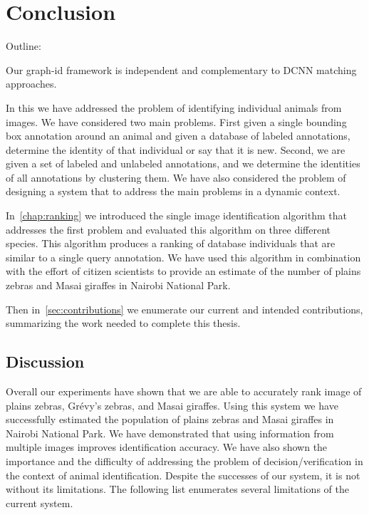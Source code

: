 \begin{comment}
    ./texfix.py --fpaths chapter6-conclusion.tex --outline --asmarkdown --numlines=99 -w
\end{comment}

\chapter{Conclusion}\label{chap:conclusion} %

    Outline:
    \begin{itemln}
        \item Our graph-id framework is independent and complementary to DCNN matching approaches.
    \end{itemln}

    In this \thesis{} we have addressed the problem of identifying individual animals from images. We have considered
    two main problems. First given a single bounding box annotation around an animal and given a database of labeled
    annotations, determine the identity of that individual or say that it is new. Second, we are given a set of labeled
    and unlabeled annotations, and we determine the identities of all annotations by clustering them. We have also
    considered the problem of designing a system that to address the main problems in a dynamic context.

    In~\cref{chap:ranking} we introduced the single image identification algorithm that addresses the first problem and
    evaluated this algorithm on three different species. This algorithm produces a ranking of database individuals that
    are similar to a single query annotation.
    We have used this algorithm in combination with the effort of citizen scientists to provide an estimate of the
    number of plains zebras and Masai giraffes in Nairobi National Park.
    
    Then in~\cref{sec:contributions} we enumerate our current and intended
      contributions, summarizing the work needed to complete this thesis.

    \section{Discussion}\label{sec:discussresult} 

        Overall our experiments have shown that we are able to accurately rank image of plains zebras, Grévy's zebras,
        and Masai giraffes. Using this system we have successfully estimated the population of plains zebras and Masai
        giraffes in Nairobi National Park. We have demonstrated that using information from multiple images improves
        identification accuracy. We have also shown the importance and the difficulty of addressing the problem of
        decision/verification in the context of animal identification. Despite the successes of our system, it is not
        without its limitations. The following list enumerates several limitations of the current system.

